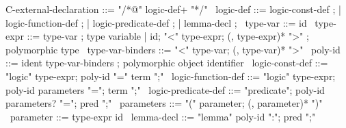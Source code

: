 \begin{syntax}
  C-external-declaration ::= "/*@" logic-def+ "*/"
  \
  logic-def ::= logic-const-def ;
          | logic-function-def ;
          | logic-predicate-def ;
          | lemma-decl ;
  \
  type-var ::= id
  \
  type-expr ::= type-var ; type variable
  | id;
    "<" type-expr;
    (, type-expr)* ">" ; polymorphic type
  \
  type-var-binders ::= "<" type-var;
                       (, type-var)* ">"
  \
  poly-id ::= ident type-var-binders ; polymorphic object identifier
  \
  logic-const-def ::= "logic" type-expr;
    poly-id "=" term ";"
  \
  logic-function-def ::= "logic" type-expr;
  poly-id parameters "=";
  term ";"
  \
  logic-predicate-def ::=
  "predicate";
  poly-id parameters? "=";
  pred ";"
  \
  parameters ::= "(" parameter;
                 (, parameter)* ")"
  \
  parameter ::= type-expr id
  \
  lemma-decl ::= "lemma" poly-id ":";
                   pred ";"
\end{syntax}
